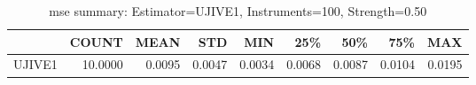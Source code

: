 \begin{table}[ht]
\centering
\caption{mse summary: Estimator=UJIVE1, Instruments=100, Strength=0.50}
\begin{tabular}{lrrrrrrrr}
\toprule
 & COUNT & MEAN & STD & MIN & 25\% & 50\% & 75\% & MAX \\
\midrule
UJIVE1 & 10.0000 & 0.0095 & 0.0047 & 0.0034 & 0.0068 & 0.0087 & 0.0104 & 0.0195 \\
\bottomrule
\end{tabular}
\end{table}
